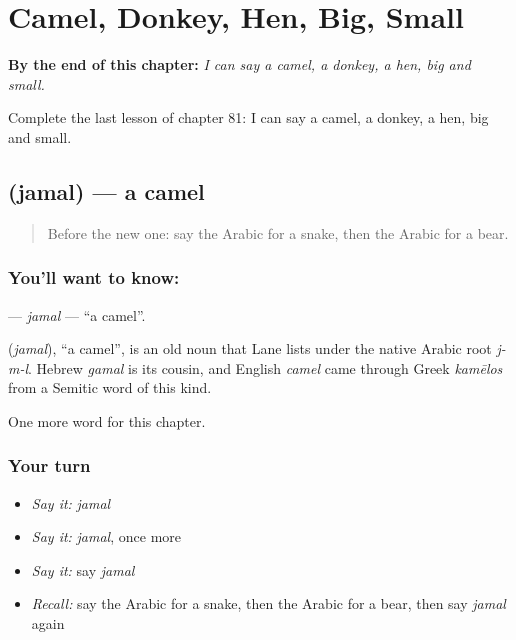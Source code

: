
\chapter{Camel, Donkey, Hen, Big, Small}
\label{ch:ar-camel-donkey-hen-big-small}

\begin{chapteropening}
\textbf{By the end of this chapter:} \emph{I can say a camel, a donkey, a hen, big and small.}

Complete the last lesson of chapter 81: I can say a camel, a donkey, a hen, big and small.
\end{chapteropening}

\section[\texorpdfstring{\ar{جمل} (jamal)}{جمل (jamal)}]{ (jamal) — a camel}

\label{lesson:AR-C81-jamal}



\begin{quote}
Before the new one: say the Arabic for a snake, then the Arabic for a bear.
\end{quote}

\subsection*{You'll want to know: }
\textbf{} — \emph{jamal} — \textquotedblleft{}a camel\textquotedblright{}.

\begin{cousinweb}
\textbf{} (\emph{jamal}), \textquotedblleft{}a camel\textquotedblright{}, is an old noun that Lane lists under the native Arabic root \emph{j-m-l}. Hebrew \emph{gamal} is its cousin, and English \emph{camel} came through Greek \emph{kamēlos} from a Semitic word of this kind.
\end{cousinweb}

\begin{grammarlens}[title={What you've built}]
One more word for this chapter.
\end{grammarlens}

\subsection*{Your turn}
\begin{itemize}
\raggedright
  \item \emph{Say it:} \emph{jamal}
  \item \emph{Say it:} \emph{jamal}, once more
  \item \emph{Say it:} say \emph{jamal}
  \item \emph{Recall:} say the Arabic for a snake, then the Arabic for a bear, then say \emph{jamal} again
\end{itemize}

